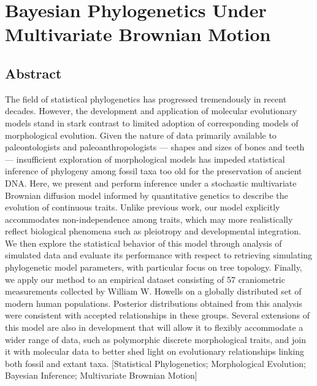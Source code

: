 \chapter{Bayesian Phylogenetics Under Multivariate Brownian Motion}

\label{chpt:Chapter2}


\clearpage

\section{Abstract}
  The field of statistical phylogenetics has progressed tremendously in recent decades. However, the development and application of molecular evolutionary models stand in stark contrast to limited adoption of corresponding models of morphological evolution. Given the nature of data primarily available to paleontologists and paleoanthropologists — shapes and sizes of bones and teeth — insufficient exploration of morphological models has impeded statistical inference of phylogeny among fossil taxa too old for the preservation of ancient DNA. Here, we present and perform inference under a stochastic multivariate Brownian diffusion model informed by quantitative genetics to describe the evolution of continuous traits. Unlike previous work, our model explicitly accommodates non-independence among traits, which may more realistically reflect biological phenomena such as pleiotropy and developmental integration. We then explore the statistical behavior of this model through analysis of simulated data and evaluate its performance with respect to retrieving simulating phylogenetic model parameters, with particular focus on tree topology. Finally, we apply our method to an empirical dataset consisting of 57 craniometric measurements collected by William W. Howells on a globally distributed set of modern human populations. Posterior distributions obtained from this analysis were consistent with accepted relationships in these groups. Several extensions of this model are also in development that will allow it to flexibly accommodate a wider range of data, such as polymorphic discrete morphological traits, and join it with molecular data to better shed light on evolutionary relationships linking both fossil and extant taxa.
  [Statistical Phylogenetics; Morphological Evolution; Bayesian Inference; Multivariate Brownian Motion]

